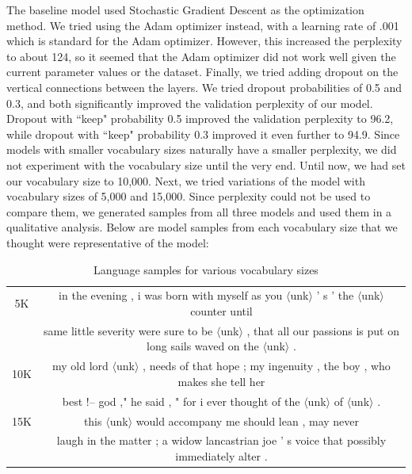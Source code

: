 \documentclass[a4paper]{article}
\begin{document}
\newline
\newline
The baseline model used Stochastic Gradient Descent as the optimization method. We tried using the Adam optimizer instead, with a learning rate of .001 which is standard for the Adam optimizer. However, this increased the perplexity to about 124, so it seemed that the Adam optimizer did not work well given the current parameter values or the dataset. Finally, we tried adding dropout on the vertical connections between the layers. We tried dropout probabilities of 0.5 and 0.3, and both significantly improved the validation perplexity of our model. Dropout with ``keep" probability 0.5 improved the validation perplexity to 96.2, while dropout with ``keep" probability 0.3 improved it even further to 94.9.
\newline
\newline
Since models with smaller vocabulary sizes naturally have a smaller perplexity, we did not experiment with the vocabulary size until the very end. Until now, we had set our vocabulary size to 10,000. Next, we tried variations of the model with vocabulary sizes of 5,000 and 15,000. Since perplexity could not be used to compare them, we generated samples from all three models and used them in a qualitative analysis.
Below are model samples from each vocabulary size that we thought were representative of the model:

\begin{table}[h]
\centering
\begin{tabular}{|c | c|} 
 \hline
 5K & in the evening , i was born with myself as you $\langle$unk$\rangle$ ' s ' the $\langle$unk$\rangle$ counter until \\ & same little severity were sure to be $\langle$unk$\rangle$ , that all our passions is put on long sails waved on the $\langle$unk$\rangle$ . \\ \hline
10K & my old lord $\langle$unk$\rangle$ , needs of that hope ; my ingenuity , the boy , who makes she tell her \\ & best !-- god ," he said , " for i ever thought of the $\langle$unk$\rangle$ of $\langle$unk$\rangle$ . \\ \hline
15K & this $\langle$unk$\rangle$ would accompany me should lean , may never \\ & laugh in the matter ; a widow lancastrian joe ' s voice that possibly immediately alter . \\ \hline
\end{tabular}
\caption{Language samples for various vocabulary sizes}
\label{table:1}
\end{table}
\end{document}
